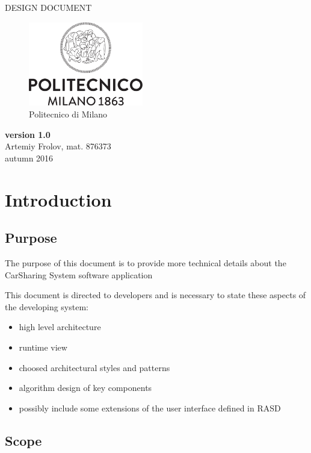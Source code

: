 \documentclass[12pt, letterpaper]{article}
\begin{document}
\begin{titlepage}
\centering
{\Large DESIGN DOCUMENT} \\
\begin{figure}[H]
\centering
\includegraphics[width=5cm]{Logo_Politecnico_Milano.png}
\caption{Politecnico di Milano}
\label{fig:PoliMi}
\end{figure}
\textbf{version 1.0} \\
\vspace{0.5cm}
Artemiy Frolov, mat. 876373 \\
\vspace{0.5cm}
autumn 2016
\end{titlepage}


\tableofcontents{}

\newpage

\section{Introduction}
\subsection{Purpose}

The purpose of this document is to provide more technical details about the CarSharing System software application 

This document is directed to developers and is necessary to state these aspects of the developing system: 
\begin{itemize}
	\item high level architecture 
	\item runtime view 
	\item choosed architectural styles and patterns
	\item algorithm design of key components 
	\item possibly include some extensions of the user interface defined in RASD 
\end{itemize}

\subsection{Scope}
\end{document}
